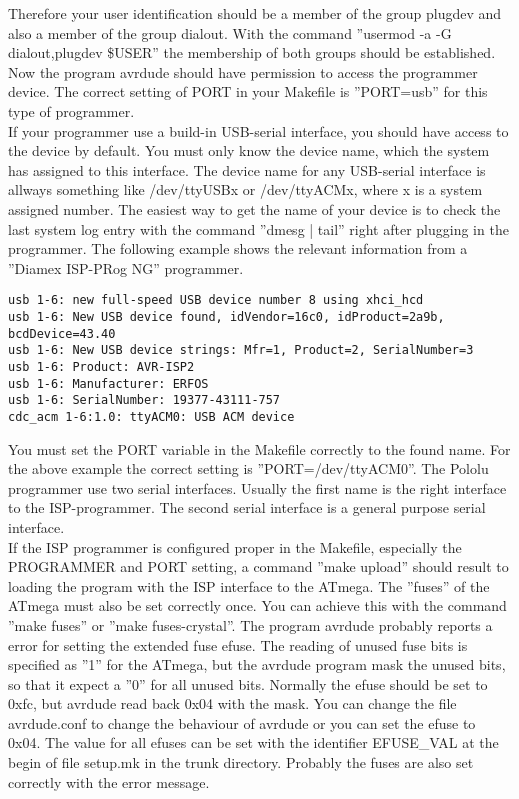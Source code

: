 Therefore your user identification should be a member of the group plugdev and also
a member of the group dialout.
With the command ''usermod -a -G dialout,plugdev \$USER'' the membership of both groups should be established.
Now the program avrdude should have permission to access the programmer device.
The correct setting of PORT in your Makefile is ''PORT=usb'' for this type of programmer.\\

If your programmer use a build-in USB-serial interface, you should have access to the device
by default. You must only know the device name, which the system has assigned to this interface.
The device name for any USB-serial interface is allways something like /dev/ttyUSBx or
/dev/ttyACMx, where x is a system assigned number. The easiest way to get the name of
your device is to check the last system log entry with the command ''dmesg | tail'' right
after plugging in the programmer.
The following example shows the relevant information from a ''Diamex ISP-PRog NG'' programmer.

\begin{verbatim}
usb 1-6: new full-speed USB device number 8 using xhci_hcd
usb 1-6: New USB device found, idVendor=16c0, idProduct=2a9b, bcdDevice=43.40
usb 1-6: New USB device strings: Mfr=1, Product=2, SerialNumber=3
usb 1-6: Product: AVR-ISP2
usb 1-6: Manufacturer: ERFOS
usb 1-6: SerialNumber: 19377-43111-757
cdc_acm 1-6:1.0: ttyACM0: USB ACM device
\end{verbatim}

You must set the PORT variable in the Makefile correctly to the found name.
For the above example the correct setting is ''PORT=/dev/ttyACM0''.
The Pololu programmer use two serial interfaces. Usually the first name is the right interface
to the ISP-programmer. The second serial interface is a general purpose serial interface.\\

If the ISP programmer is configured proper in the Makefile, especially the PROGRAMMER
and PORT setting, a command ''make upload''
should result to loading the program with the ISP interface to the ATmega.
The ''fuses'' of the ATmega must also be set correctly once.
You can achieve this with the command ''make fuses'' or ''make fuses-crystal''.
The program avrdude probably reports a error for setting the extended fuse efuse.
The reading of unused fuse bits is specified as ''1'' for the ATmega, but the
avrdude program mask the unused bits, so that it expect a ''0'' for all unused bits.
Normally the efuse should be set to 0xfc, but avrdude read back 0x04 with the mask.
You can change the file avrdude.conf to change the behaviour of avrdude or
you can set the efuse to 0x04. 
The value for all efuses can be set with the identifier EFUSE\_VAL at the begin of file setup.mk
in the trunk directory.
Probably the fuses are also set correctly with the error message.

